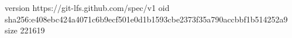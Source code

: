 version https://git-lfs.github.com/spec/v1
oid sha256:e408ebc424a4071c6b9ecf501e0d1b1593cbe2373f35a790accbbf1b514252a9
size 221619
